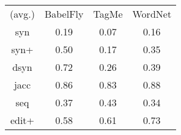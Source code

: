 \begin{tabular}{cccc}
(avg.) & BabelFly & TagMe & WordNet\\ 
syn & 0.19 & 0.07 & 0.16\\ 
syn+ & 0.50 & 0.17 & 0.35\\ 
dsyn & 0.72 & 0.26 & 0.39\\ 
jacc & 0.86 & 0.83 & 0.88\\ 
seq & 0.37 & 0.43 & 0.34\\ 
edit+ & 0.58 & 0.61 & 0.73
\end{tabular}